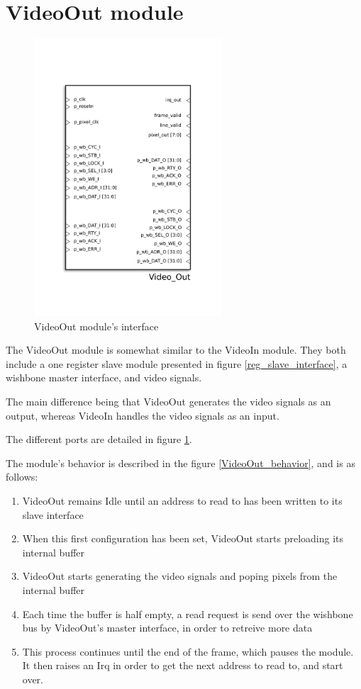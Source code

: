 
\section{VideoOut module}

\begin{figure}[H]
\center
\includegraphics[width=7cm]{figs/Video_out.pdf}
\caption{VideoOut module's interface}
\label{VideoOut_interface}
\end{figure}

The VideoOut module is somewhat similar to the VideoIn module. They both include a one register slave module presented in figure \ref{reg_slave_interface}, a wishbone master interface, and video signals.

The main difference being that VideoOut generates the video signals as an output, whereas VideoIn handles the video signals as an input.

The different ports are detailed in figure \ref{VideoOut_interface}.

The module's behavior is described in the figure \ref{VideoOut_behavior}, and is as follows:
\begin{enumerate}
\item VideoOut remains Idle until an address to read to has been written to its slave interface
\item When this first configuration has been set, VideoOut starts preloading its internal buffer
\item VideoOut starts generating the video signals and poping pixels from the internal buffer
\item Each time the buffer is half empty, a read request is send over the wishbone bus by VideoOut's master interface, in order to retreive more data
\item This process continues until the end of the frame, which pauses the module. It then raises an Irq in order to get the next address to read to, and start over.
\end{enumerate}


